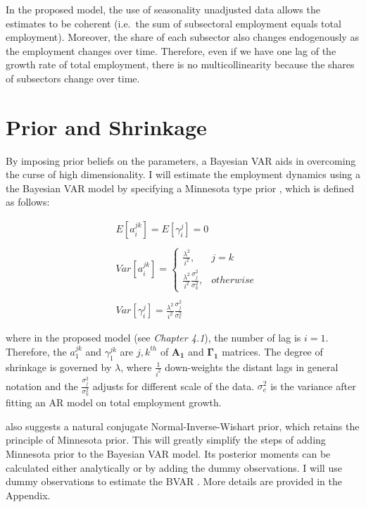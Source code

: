 \documentclass{monashthesis}
\begin{document}
In the proposed model, the use of seasonality unadjusted data allows the estimates to be coherent (i.e.~the sum of subsectoral employment equals total employment). Moreover, the share of each subsector also changes endogenously as the employment changes over time. Therefore, even if we have one lag of the growth rate of total employment, there is no multicollinearity because the shares of subsectors change over time.

\hypertarget{prior-and-shrinkage}{%
\section{Prior and Shrinkage}\label{prior-and-shrinkage}}

By imposing prior beliefs on the parameters, a Bayesian VAR aids in overcoming the curse of high dimensionality\autocite{banbura2010large}. I will estimate the employment dynamics using a the Bayesian VAR model by specifying a Minnesota type prior \autocites[e.g.][]{anderson2020,litterman1986,robertson1999vector}, which is defined as follows:

\[
\begin{aligned}\label{eq:1}
&E[a_{i}^{jk}] = E[\gamma_{i}^j]=0\\
\\
&Var[a_i^{jk}]= 
\begin{cases}
\frac{\lambda^2}{i^2},&j=k\\
\frac{\lambda^2}{i^2}\frac{\sigma^2_{j}}{\sigma^2_k},& otherwise
\end{cases}\\
\\
&Var[\gamma_i^{j}]=\frac{\lambda^2}{i^2}\frac{\sigma^2_{j}}{\sigma^2_e}
\end{aligned}
\]

where in the proposed model (see \emph{Chapter 4.1}), the number of lag is \(i=1\). Therefore, the \(a_{1}^{jk}\) and \(\gamma_{1}^{jk}\) are \({j,k}^{th}\) of \(\bm{A_1}\) and \(\bm{\Gamma_1}\) matrices. The degree of shrinkage is governed by \(\lambda\), where \(\frac{1}{i^2}\) down-weights the distant lags in general notation and the \(\frac{\sigma_j^2}{\sigma_k^2}\) adjusts for different scale of the data. \(\sigma^2_e\) is the variance after fitting an AR model on total employment growth.

\textcite{banbura2010large} also suggests a natural conjugate Normal-Inverse-Wishart prior, which retains the principle of Minnesota prior. This will greatly simplify the steps of adding Minnesota prior to the Bayesian VAR model. Its posterior moments can be calculated either analytically or by adding the dummy observations. I will use dummy observations to estimate the BVAR \autocite{banbura2010large}. More details are provided in the Appendix.
\end{document}
